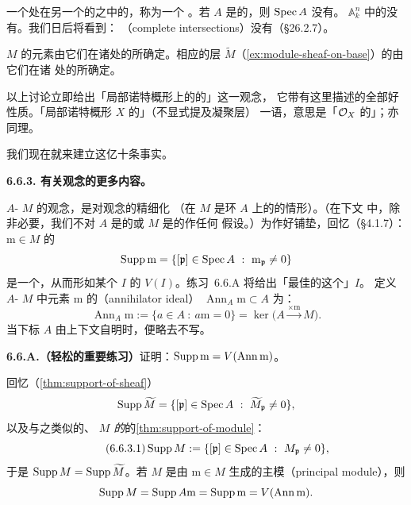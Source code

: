 一个处在另一个\trAssociatedPoint{}的\trClosure{}之中的\trAssociatedPoint，称为一个%
\emph{\trEmbeddedPoint}。若 $A$ 是\trReduced{}的，则 $\operatorname{Spec} A$ 没有\trEmbeddedPoint。%
$\mathbb{A}^n_k$ 中的\trHypersurface{}没有\trEmbeddedPoint。我们日后将看到：\trCompleteIntersection{}%
（complete intersections）没有\trEmbeddedPoint{}（\S26.2.7）。

$M$ 的元素由它们在诸\trAssociatedPoint{}处的\trLocalization{}所确定。相应的层
$\widetilde{M}$（\cref{ex:module-sheaf-on-base}）的\trSection{}由它们在诸%
\trAssociatedPoint{}处的\trGerm{}所确定。

以上讨论立即给出「局部诺特概形上的\trCoherentSheaf{}的\trAssociatedPoint」这一观念，
它带有这里描述的全部好性质。「局部诺特概形 $X$ 的\trAssociatedPoint」（不显式提及凝聚层）
一语，意思是「$\mathcal{O}_X$ 的\trAssociatedPoint」；\textbf{\trEmbeddedPoint}亦同理。

我们现在就来建立这亿十条事实。

\textbf{6.6.3. 有关\trSupport{}观念的更多内容。}

$A$-\trModule{} $M$ 的\emph{\trAssociatedPoint}观念，是对\emph{\trSupport}观念的精细化
（在 $M$ 是\trNoetherian{}环 $A$ 上的\trFinitelyGenerated{}\trModule{}的情形）。（在下文
中，除非必要，我们不对 $A$ 是\trNoetherian{}的或 $M$ 是\trFinitelyGenerated{}的作任何
假设。）为作好铺垫，回忆（\S4.1.7）：$\mathrm{m}\in M$ 的\emph{\trSupport}
\[
\Supp\mathrm{m}=\{[\mathfrak{p}]\in\Spec A\ :\ \mathrm{m}_{\mathfrak{p}}\neq 0\}
\]
是一个\trClosedSubset，从而形如某个 $I$ 的 $V(I)$。练习~6.6.A 将给出「最佳的这个」$I$。
定义 $A$-\trModule{} $M$ 中元素 $\mathrm{m}$ 的\textbf{\trAnnihilatorIdeal{}}（annihilator ideal）
$\operatorname{Ann}_A\mathrm{m}\subset A$ 为：
\[
\operatorname{Ann}_A\mathrm{m}:=\{a\in A\ :\ a\mathrm{m}=0\}
  =\ker\bigl(A\xrightarrow{\times\mathrm{m}}M\bigr).
\]
当下标 $A$ 由上下文自明时，便略去不写。

\textbf{6.6.A.（轻松的重要练习）}\quad 证明：$\operatorname{Supp}\mathrm{m}=V(\operatorname{Ann}\mathrm{m})$。

回忆（\cref{thm:support-of-sheaf}）
\[
\Supp\widetilde{M}=\{[\mathfrak{p}]\in\Spec A\ :\ \widetilde{M}_{\mathfrak{p}}\neq 0\},
\]
以及与之类似的、\emph{\trModule{} $M$ 的\trSupport}的\cref{thm:support-of-module}：
\begin{equation*}\tag{6.6.3.1}\label{eq:supp-module-definition}
\operatorname{Supp} M:=\{[\mathfrak{p}]\in\operatorname{Spec} A\ :\ M_{\mathfrak{p}}\neq 0\},
\end{equation*}
于是 $\operatorname{Supp} M=\operatorname{Supp}\widetilde{M}$。若 $M$ 是由 $\mathrm{m}\in M$ 生成的主模（principal
module），则
\[
\operatorname{Supp} M=\operatorname{Supp} A\mathrm{m}=\operatorname{Supp}\mathrm{m}=V(\operatorname{Ann}\mathrm{m}).
\]

